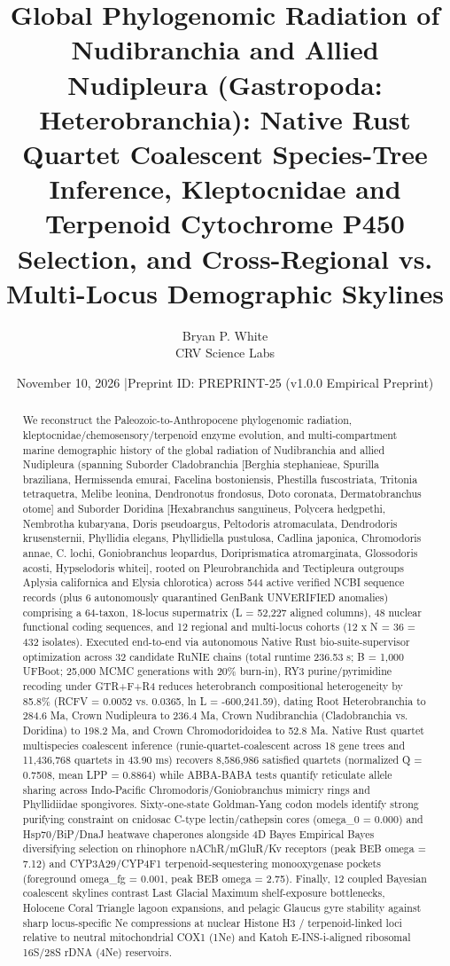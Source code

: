 \documentclass[10pt,letterpaper]{article}
\title{Global Phylogenomic Radiation of Nudibranchia and Allied Nudipleura (Gastropoda: Heterobranchia): Native Rust Quartet Coalescent Species-Tree Inference, Kleptocnidae and Terpenoid Cytochrome P450 Selection, and Cross-Regional vs. Multi-Locus Demographic Skylines}
\author{Bryan P. White \\ CRV Science Labs}
\date{November 10, 2026 \quad|\quad Preprint ID: PREPRINT-25 (v1.0.0 Empirical Preprint)}
\begin{document}
\maketitle
\begin{abstract}
We reconstruct the Paleozoic-to-Anthropocene phylogenomic radiation, kleptocnidae/chemosensory/terpenoid enzyme evolution, and multi-compartment marine demographic history of the global radiation of Nudibranchia and allied Nudipleura (spanning Suborder Cladobranchia [Berghia stephanieae, Spurilla braziliana, Hermissenda emurai, Facelina bostoniensis, Phestilla fuscostriata, Tritonia tetraquetra, Melibe leonina, Dendronotus frondosus, Doto coronata, Dermatobranchus otome] and Suborder Doridina [Hexabranchus sanguineus, Polycera hedgpethi, Nembrotha kubaryana, Doris pseudoargus, Peltodoris atromaculata, Dendrodoris krusensternii, Phyllidia elegans, Phyllidiella pustulosa, Cadlina japonica, Chromodoris annae, C. lochi, Goniobranchus leopardus, Doriprismatica atromarginata, Glossodoris acosti, Hypselodoris whitei], rooted on Pleurobranchida and Tectipleura outgroups Aplysia californica and Elysia chlorotica) across 544 active verified NCBI sequence records (plus 6 autonomously quarantined GenBank UNVERIFIED anomalies) comprising a 64-taxon, 18-locus supermatrix (L = 52,227 aligned columns), 48 nuclear functional coding sequences, and 12 regional and multi-locus cohorts (12 x N = 36 = 432 isolates). Executed end-to-end via autonomous Native Rust bio-suite-supervisor optimization across 32 candidate RuNIE chains (total runtime 236.53 s; B = 1,000 UFBoot; 25,000 MCMC generations with 20\% burn-in), RY3 purine/pyrimidine recoding under GTR+F+R4 reduces heterobranch compositional heterogeneity by 85.8\% (RCFV = 0.0052 vs. 0.0365, ln L = -600,241.59), dating Root Heterobranchia to 284.6 Ma, Crown Nudipleura to 236.4 Ma, Crown Nudibranchia (Cladobranchia vs. Doridina) to 198.2 Ma, and Crown Chromodoridoidea to 52.8 Ma. Native Rust quartet multispecies coalescent inference (runie-quartet-coalescent across 18 gene trees and 11,436,768 quartets in 43.90 ms) recovers 8,586,986 satisfied quartets (normalized Q = 0.7508, mean LPP = 0.8864) while ABBA-BABA tests quantify reticulate allele sharing across Indo-Pacific Chromodoris/Goniobranchus mimicry rings and Phyllidiidae spongivores. Sixty-one-state Goldman-Yang codon models identify strong purifying constraint on cnidosac C-type lectin/cathepsin cores (omega\_0 = 0.000) and Hsp70/BiP/DnaJ heatwave chaperones alongside 4D Bayes Empirical Bayes diversifying selection on rhinophore nAChR/mGluR/Kv receptors (peak BEB omega = 7.12) and CYP3A29/CYP4F1 terpenoid-sequestering monooxygenase pockets (foreground omega\_fg = 0.001, peak BEB omega = 2.75). Finally, 12 coupled Bayesian coalescent skylines contrast Last Glacial Maximum shelf-exposure bottlenecks, Holocene Coral Triangle lagoon expansions, and pelagic Glaucus gyre stability against sharp locus-specific Ne compressions at nuclear Histone H3 / terpenoid-linked loci relative to neutral mitochondrial COX1 (1Ne) and Katoh E-INS-i-aligned ribosomal 16S/28S rDNA (4Ne) reservoirs.
\end{abstract}
\end{document}
